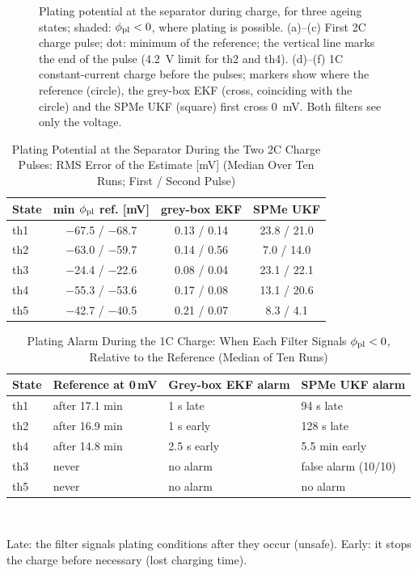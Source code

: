 \documentclass[journal]{IEEEtran}
\begin{document}
\begin{figure}[t]
\centering

\caption{Plating potential at the separator during charge, for three ageing states; shaded: $\phi_{\mathrm{pl}}<0$, where plating is possible. (a)--(c) First 2C charge pulse; dot: minimum of the reference; the vertical line marks the end of the pulse (\SI{4.2}{\volt} limit for th2 and th4). (d)--(f) 1C constant-current charge before the pulses; markers show where the reference (circle), the grey-box EKF (cross, coinciding with the circle) and the SPMe UKF (square) first cross \SI{0}{\milli\volt}. Both filters see only the voltage.}
\label{fig:charge}
\end{figure}

\begin{table}[t]
\centering
\caption{Plating Potential at the Separator During the Two 2C Charge Pulses: RMS Error of the Estimate [mV] (Median Over Ten Runs; First / Second Pulse)}
\label{tab:pulse}
\footnotesize\setlength{\tabcolsep}{4pt}
\begin{tabular}{@{}lccc@{}}
\toprule
State & min $\phi_{\mathrm{pl}}$ ref. [mV] & grey-box EKF & SPMe UKF\\
\midrule
th1 & $-$67.5 / $-$68.7 & 0.13 / 0.14 & 23.8 / 21.0\\
th2 & $-$63.0 / $-$59.7 & 0.14 / 0.56 & 7.0 / 14.0\\
th3 & $-$24.4 / $-$22.6 & 0.08 / 0.04 & 23.1 / 22.1\\
th4 & $-$55.3 / $-$53.6 & 0.17 / 0.08 & 13.1 / 20.6\\
th5 & $-$42.7 / $-$40.5 & 0.21 / 0.07 & 8.3 / 4.1\\
\bottomrule
\end{tabular}
\end{table}

\begin{table}[t]
\centering
\caption{Plating Alarm During the 1C Charge: When Each Filter Signals $\phi_{\mathrm{pl}}<0$, Relative to the Reference (Median of Ten Runs)}
\label{tab:cc}
\footnotesize\setlength{\tabcolsep}{3pt}
\begin{tabular}{@{}llll@{}}
\toprule
State & Reference at 0\,mV & Grey-box EKF alarm & SPMe UKF alarm\\
\midrule
th1 & after 17.1 min & 1 s late & 94 s late\\
th2 & after 16.9 min & 1 s early & 128 s late\\
th4 & after 14.8 min & 2.5 s early & 5.5 min early\\
th3 & never & no alarm & false alarm (10/10)\\
th5 & never & no alarm & no alarm\\
\bottomrule
\end{tabular}\\[2pt]
\parbox{\columnwidth}{\footnotesize Late: the filter signals plating conditions after they occur (unsafe). Early: it stops the charge before necessary (lost charging time).}
\end{table}
\end{document}
